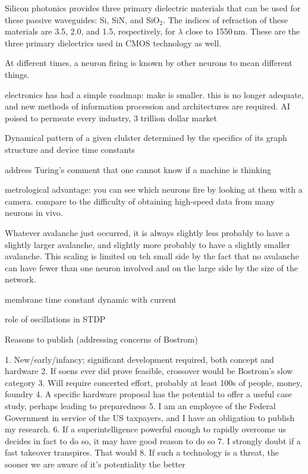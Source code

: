 \vspace{2em}
Silicon photonics provides three primary dielectric materials that can be used for these passive waveguides: Si, SiN, and SiO$_2$. The indices of refraction of these materials are 3.5, 2.0, and 1.5, respectively, for $\lambda$ close to 1550\,nm. These are the three primary dielectrics used in CMOS technology as well. 

\vspace{2em}
At different times, a neuron firing is known by other neurons to mean different things.

\vspace{3em}
electronics has had a simple roadmap: make is smaller. this is no longer adequate, and new methods of information procession and architectures are required. AI poised to permeate every industry, 3 trillion dollar market

\vspace{3em}
Dynamical pattern of a given clulster determined by the specifics of its graph structure and device time constants

\vspace{3em}
address Turing's comment that one cannot know if a machine is thinking

\vspace{3em}
metrological advantage: you can see which neurons fire by looking at them with a camera. compare to the difficulty of obtaining high-speed data from many neurons in vivo.

\vspace{3em}
Whatever avalanche just occurred, it is always slightly less probably to have a slightly larger avalanche, and slightly more probably to have a slightly smaller avalanche. This scaling is limited on teh small side by the fact that no avalanche can have fewer than one neuron involved and on the large side by the size of the network.

\vspace{3em}
membrane time constant dynamic with current

\vspace{3em}
role of oscillations in STDP

\vspace{3em}
Reasons to publish (addressing concerns of Bostrom)

1. New/early/infancy; significant development required, both concept and hardware
2. If soens ever did prove feasible, crossover would be Bostrom's slow category
3. Will require concerted effort, probably at least 100s of people, money, foundry
4. A specific hardware proposal has the potential to offer a useful case study, perhaps leading to preparedness
5. I am an employee of the Federal Government in service of the US taxpayers, and I have an obligation to publish my research.
6. If a superintelligence powerful enough to rapidly overcome us decides in fact to do so, it may have good reason to do so
7. I strongly doubt if a fast takeover transpires. That would
8. If such a technology is a threat, the sooner we are aware of it's potentiality the better

